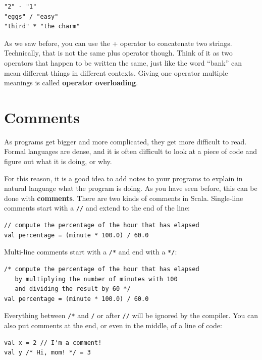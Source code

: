 \documentclass[10pt]{book}
\begin{document}
\beforeverb
\begin{verbatim}
"2" - "1"
"eggs" / "easy"
"third" * "the charm"
\end{verbatim}
\afterverb

As we saw before, you can use the + operator to concatenate two strings. Technically, that is not
 the same plus operator though. Think of it as two operators that happen to be written the same, just
 like the word ``bank'' can mean different things in different contexts.
 Giving one operator multiple meanings is called {\bf operator overloading}.


\section{Comments}

As programs get bigger and more complicated, they get more difficult
to read.  Formal languages are dense, and it is often difficult to
look at a piece of code and figure out what it is doing, or why.

For this reason, it is a good idea to add notes to your programs to explain
in natural language what the program is doing.  As you have seen before, this can be done with {\bf comments}. There are two kinds of comments in Scala. Single-line comments start with a {\tt //} and extend to the end of the line:

\beforeverb
\begin{verbatim}
// compute the percentage of the hour that has elapsed
val percentage = (minute * 100.0) / 60.0
\end{verbatim}
\afterverb

Multi-line comments start with a \verb"/*" and end with a \verb"*/":

\beforeverb
\begin{verbatim}
/* compute the percentage of the hour that has elapsed
   by multiplying the number of minutes with 100
   and dividing the result by 60 */
val percentage = (minute * 100.0) / 60.0
\end{verbatim}
\afterverb

Everything between {\tt /*} and {\tt */} or after {\tt //} will be ignored by the compiler. 
You can also put comments at the end, or even in the middle, of a 
line of code:

\beforeverb
\begin{verbatim}
val x = 2 // I'm a comment!
val y /* Hi, mom! */ = 3
\end{verbatim}
\afterverb
\end{document}
